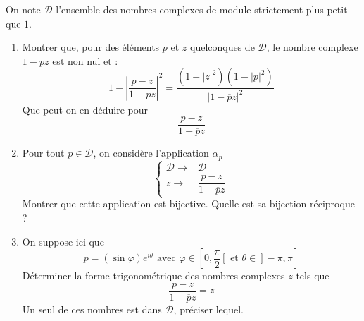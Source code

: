 On note $\mathcal D$ l'ensemble des nombres complexes de module strictement plus petit que $1$.
\begin{enumerate}
 \item Montrer que, pour des éléments $p$ et $z$ quelconques de $\mathcal D$, le nombre complexe $1-\overline{p}z$ est non nul et :
\begin{displaymath}
 1-\left\vert  \dfrac{p-z}{1-\overline{p}z} \right\vert ^2
=
\dfrac{(1-|z|^2)(1-|p|^2)}{|1-\overline{p}z|^2}
\end{displaymath}
Que peut-on en déduire pour 
\begin{displaymath}
 \dfrac{p-z}{1-\overline{p}z}
\end{displaymath}

\item Pour tout $p\in \mathcal D$, on considère l'application $\alpha_p$
\begin{displaymath}
 \left\lbrace 
\begin{aligned}
 \mathcal D \rightarrow& \mathcal D \\
 z \rightarrow& \dfrac{p-z}{1-\overline{p}z}
\end{aligned}
\right. 
\end{displaymath}
Montrer que cette application est bijective. Quelle est sa bijection réciproque ?
\item On suppose ici que
\begin{displaymath}
 p=(\sin \varphi) e^{i\theta} \text{ avec } \varphi\in [0,\frac{\pi}{2}[ \text{ et } \theta \in ]-\pi,\pi]
\end{displaymath}
Déterminer la forme trigonométrique des nombres complexes $z$ tels que
\begin{displaymath}
 \dfrac{p-z}{1-\overline{p}z}=z
\end{displaymath}
Un seul de ces nombres est dans $\mathcal D$, préciser lequel.
\end{enumerate}

